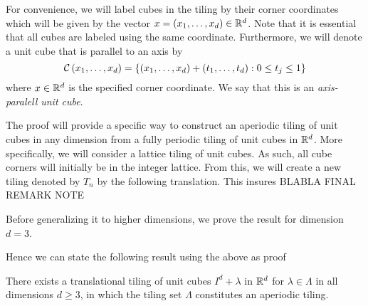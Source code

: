 \documentclass[../thesis.tex]{subfiles}
\begin{document}
For convenience, we will label cubes in the tiling by their corner coordinates which will be given by the vector $x = (x_1,\dots,x_d) \in \mathbb{R}^d$. Note that it is essential that all cubes are labeled using the same coordinate. Furthermore, we will denote a unit cube that is parallel to an axis by
\begin{equation*}
    \mathcal{C}\left(x_1,\dots,x_d\right) = \left\{(x_1,\dots,x_d) + (t_1,\dots,t_d) : 0 \leq t_j \leq 1\right\}
\end{equation*} 
where $x\in \mathbb{R}^d$ is the specified corner coordinate. We say that this is an \emph{axis-paralell unit cube}. 

The proof will provide a specific way to construct an aperiodic tiling of unit cubes in any dimension from a fully periodic tiling of unit cubes in $\mathbb{R}^d$. More specifically, we will consider a lattice tiling of unit cubes. As such, all cube corners will initially be in the integer lattice. From this, we will create a new tiling denoted by $T_n$ by the following translation. This insures
BLABLA FINAL REMARK NOTE



Before generalizing it to higher dimensions, we prove the result for dimension $d=3$. 





Hence we can state the following result using the above as proof

\begin{theorem}
    There exists a translational tiling of unit cubes $I^d + \lambda$ in $\mathbb{R}^d$ for $\lambda\in \Lambda$ in all dimensions $d\geq3$, in which the tiling set $\Lambda$ constitutes an aperiodic tiling. 
\end{theorem}
\end{document}
